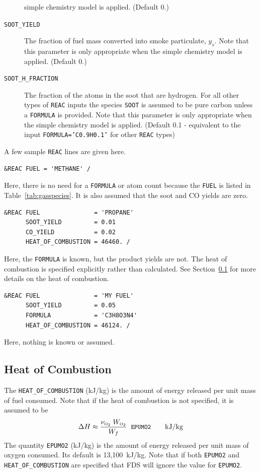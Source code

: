 \documentclass[11pt]{book}
\newcommand{\ct}{\tt\small}
\newcommand{\be}{\begin{equation}}
\newcommand{\ee}{\end{equation}}
\newcommand{\OTWO}{{\tiny \hbox{O}_2}}
\begin{document}
\begin{description}
simple chemistry model is applied. (Default 0.)
\item[{\ct SOOT\_YIELD}] The fraction of fuel mass converted into smoke particulate, $y_s$.
Note that this parameter is only appropriate when the simple chemistry model is applied.  (Default 0.)
\item[{\ct SOOT\_H\_FRACTION}] The fraction of the atoms in the soot that are hydrogen.
For all other types of {\ct REAC} inputs the species {\ct SOOT} is assumed to be pure carbon unless a {\ct FORMULA} is provided.
Note that this parameter is only appropriate when the simple chemistry model is applied.
(Default 0.1 - equivalent to the input {\ct FORMULA='C0.9H0.1'} for other {\ct REAC} types)
\end{description}

\noindent
A few sample {\ct REAC} lines are given here.

\footnotesize
\begin{verbatim}
&REAC FUEL = 'METHANE' /
\end{verbatim}
\normalsize
\noindent Here, there is no need for a {\ct FORMULA} or atom count because the {\ct FUEL} is listed in Table~\ref{tab:gasspecies}. It is also assumed that the soot and CO
yields are zero.

\footnotesize
\begin{verbatim}
&REAC FUEL               = 'PROPANE'
      SOOT_YIELD         = 0.01
      CO_YIELD           = 0.02
      HEAT_OF_COMBUSTION = 46460. /
\end{verbatim}
\normalsize
\noindent Here, the {\ct FORMULA} is known, but the product yields are not. The heat of combustion is specified explicitly rather than calculated. See
Section~\ref{info:heat_of_combustion} for more details on the heat of combustion.

\footnotesize
\begin{verbatim}
&REAC FUEL               = 'MY FUEL'
      SOOT_YIELD         = 0.05
      FORMULA            = 'C3H8O3N4'
      HEAT_OF_COMBUSTION = 46124. /
\end{verbatim}
\normalsize
\noindent Here, nothing is known or assumed.




\subsection{Heat of Combustion}
\label{info:heat_of_combustion}

The {\ct HEAT\_OF\_COMBUSTION} (kJ/kg) is the amount of
energy released per unit mass of fuel consumed. Note that if the heat of combustion is not
specified, it is assumed to be
\be \Delta H \approx \frac{\nu_{\OTWO} \; W_{\OTWO} } { W_{f} } \; \; \hbox{\ct EPUMO2}  \quad \quad \hbox{kJ/kg}  \label{EPUMO2} \ee
The quantity {\ct EPUMO2} (kJ/kg) is the amount of energy released per unit mass of oxygen consumed.
Its default is 13,100~kJ/kg.  Note that if both {\ct EPUMO2} and {\ct HEAT\_OF\_COMBUSTION} are
specified that FDS will ignore the value for {\ct EPUMO2}.
\end{document}
